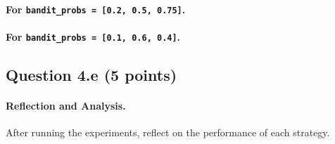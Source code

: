 \documentclass[12pt]{article}
\begin{document}
\paragraph{For \texttt{bandit\_probs = [0.2, 0.5, 0.75]}.}
\begin{solution}


\end{solution}

\paragraph{For \texttt{bandit\_probs = [0.1, 0.6, 0.4]}.}
\begin{solution}

\end{solution}

\subsection*{Question 4.e (5 points) } 
\paragraph{Reflection and Analysis.}
After running the experiments, reflect on the performance of each strategy.
\begin{solution}

\end{solution}
\end{document}
